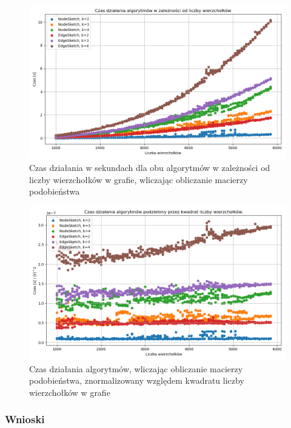 \begin{figure}[!ht]
    \includegraphics[width=14cm]{img/time_matrix_all.png}
    \centering
    \caption[Czas działania z macierzą podobieństwa]{Czas działania w sekundach dla obu algorytmów w zależności od liczby wierzchołków w grafie, wliczając obliczanie macierzy podobieństwa}
    \label{fig:time_matrix_vs_vertices}
\end{figure}

\begin{figure}[!ht]
    \includegraphics[width=14cm]{img/time_matrix_normalized.png}
    \centering
    \caption[Znormalizowany czas działania z macierzą podobieństwa]{Czas działania algorytmów, wliczając obliczanie macierzy podobieństwa, znormalizowany względem kwadratu liczby wierzchołków w grafie}
    \label{fig:time_matrix_vs_vertices_nomralized}
\end{figure}

\subsubsection*{Wnioski}

